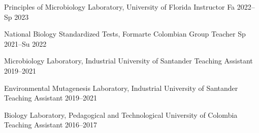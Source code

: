 


\begin{cvhonors}

\cvhonor
{Principles of Microbiology Laboratory, University of Florida}
{Instructor}
{Fa 2022--Sp 2023}

\cvhonor
{National Biology Standardized Tests, Formarte Colombian Group}
{Teacher}
{Sp 2021--Su 2022}

\cvhonor
{Microbiology Laboratory, Industrial University of Santander}
{Teaching Assistant}
{2019--2021}

\cvhonor
{Environmental Mutagenesis Laboratory, Industrial University of Santander}
{Teaching Assistant}
{2019--2021}

\cvhonor
{Biology Laboratory, Pedagogical and Technological University of Colombia}
{Teaching Assistant}
{2016--2017}


\end{cvhonors}
\vspace{1.5mm}


\begin{minipage}[t]{.333\linewidth}
\begin{cvdatedlist}
\end{cvdatedlist}
\end{minipage}
\begin{minipage}[t]{.333\linewidth}
\begin{cvdatedlist}
\end{cvdatedlist}
\end{minipage}
\begin{minipage}[t]{.333\linewidth}
\begin{cvdatedlist}
\end{cvdatedlist}
\end{minipage}
